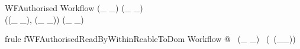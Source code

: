 \begin{schema}{WFAuthorised}
   Workflow
\where
   (\_ \readBy \_) \subseteq (\_ \readableTo \_)
 \\
   ((\_ \writes \_), (\_ \canWrite \_)) \in (\_ \subseteq \_)
\end{schema}

\begin{theorem}{frule fWFAuthorisedReadByWithinReableToDom}
    \forall Workflow @ \dom~(\_ \readBy \_) \in \power~(\dom~(\_\readableTo \_))
\end{theorem}
